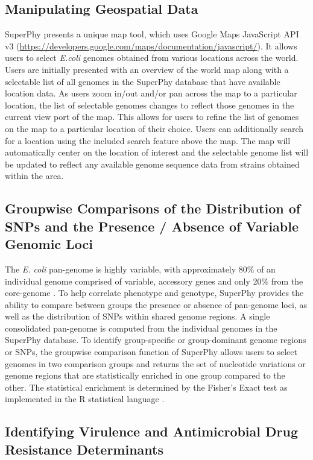 \documentclass[a4paper,twoside]{article}
\begin{document}
\subsection{Manipulating Geospatial Data}
SuperPhy presents a unique map tool, which uses Google Maps JavaScript API v3 (\url{https://developers.google.com/maps/documentation/javascript/}). It allows users to select \textit{E.coli} genomes obtained from various locations across the world. Users are initially presented with an overview of the world map along with a selectable list of all genomes in the SuperPhy database that have available location data. As users zoom in/out and/or pan across the map to a particular location, the list of selectable genomes changes to reflect those genomes in the current view port of the map. This allows for users to refine the list of genomes on the map to a particular location of their choice. Users can additionally search for a location using the included search feature above the map. The map will automatically center on the location of interest and the selectable genome list will be updated to reflect any available genome sequence data from strains obtained within the area.  

\subsection{Groupwise Comparisons of the Distribution of SNPs and the Presence / Absence of Variable Genomic Loci}

The \textit{E. coli} pan-genome is highly variable, with approximately 80\% of an individual genome comprised of variable, accessory genes and only 20\% from the core-genome \cite{lukjancenko_comparison_2010}. To help correlate phenotype and genotype, SuperPhy provides the ability to compare between groups the presence or absence of pan-genome loci, as well as the distribution of SNPs within shared genome regions. A single consolidated pan-genome is computed from the individual genomes in the SuperPhy database. To identify group-specific or group-dominant genome regions or SNPs, the groupwise comparison function of SuperPhy allows users to select genomes in two comparison groups and returns the set of nucleotide variations or genome regions that are statistically enriched in one group compared to the other. The statistical enrichment is determined by the Fisher's Exact test as implemented in the R statistical language \cite{R_manual}.


\subsection{Identifying Virulence and Antimicrobial Drug Resistance Determinants}
\end{document}
